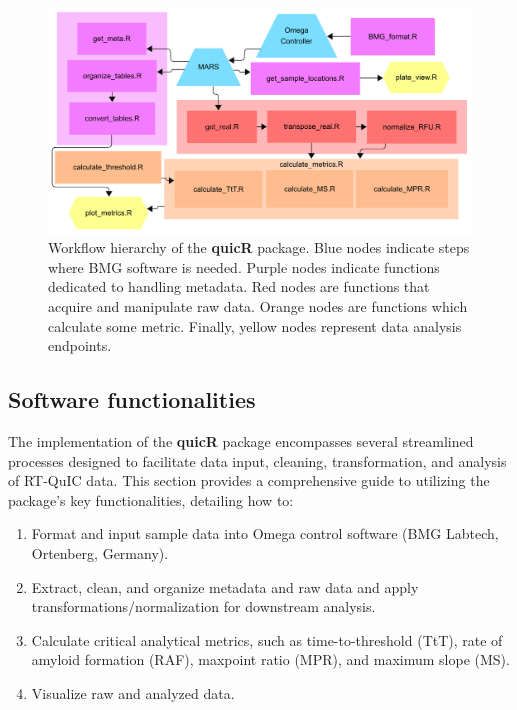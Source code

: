 \documentclass[preprint,12pt,a4paper]{elsarticle}
\begin{document}
            \begin{figure}[ht]
                \centering
                \includegraphics[width=\textwidth]{images/workflow.png}
                \caption{Workflow hierarchy of the \textbf{quicR} package. Blue nodes indicate steps where BMG software is needed. Purple nodes indicate functions dedicated to handling metadata. Red nodes are functions that acquire and manipulate raw data. Orange nodes are functions which calculate some metric. Finally, yellow nodes represent data analysis endpoints.}\label{fig:workflow}
            \end{figure}

        \subsection{Software functionalities}
            The implementation of the \textbf{quicR} package encompasses several streamlined processes designed to facilitate data input, cleaning, transformation, and analysis of RT-QuIC data. This section provides a comprehensive guide to utilizing the package's key functionalities, detailing how to:

            \begin{enumerate}
                \item Format and input sample data into Omega control software (BMG Labtech, Ortenberg, Germany).
                \item Extract, clean, and organize metadata and raw data and apply transformations/normalization for downstream analysis.
                \item Calculate critical analytical metrics, such as time-to-threshold (TtT), rate of amyloid formation (RAF), maxpoint ratio (MPR), and maximum slope (MS).
                \item Visualize raw and analyzed data.
            \end{enumerate}
\end{document}

